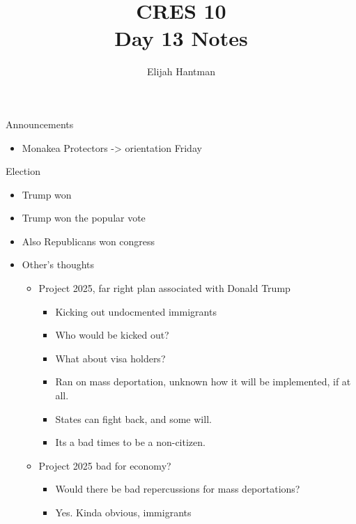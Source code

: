 \documentclass{report}
\title{\Huge{CRES 10}\\Day 13 Notes}
\author{\huge{Elijah Hantman}}
\date{}
\begin{document}
\maketitle
\newpage

\begin{description}
    \item {\large Announcements} 
        \begin{itemize}
            \item Monakea Protectors -> orientation Friday
        \end{itemize}

    \item {\large Election} 
        \begin{itemize}
            \item Trump won
            \item Trump won the popular vote
            \item Also Republicans won congress
            \item Other's thoughts
                \begin{itemize}
                    \item Project 2025, far right plan
                        associated with Donald Trump
                        \begin{itemize}
                            \item Kicking out undocmented immigrants
                            \item Who would be kicked out?
                            \item What about visa holders?
                            \item Ran on mass deportation,
                                unknown how it will be
                                implemented, if at all.
                            \item States can fight back,
                                and some will.
                            \item Its a bad times to be
                                a non-citizen.
                        \end{itemize}
                    \item Project 2025 bad for economy?
                        \begin{itemize}
                            \item Would there be bad repercussions
                                for mass deportations?
                            \item Yes. Kinda obvious, immigrants

\end{itemize}
\end{itemize}
\end{itemize}
\end{description}
\end{document}
